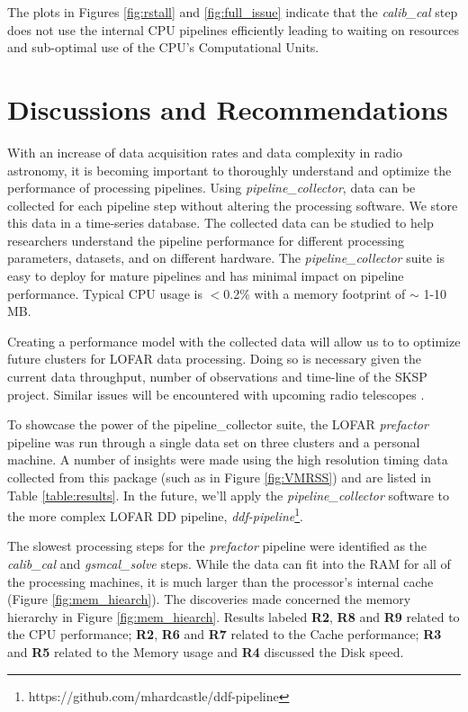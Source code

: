 The plots in Figures \ref{fig:rstall} and \ref{fig:full_issue} indicate that the \textit{calib\_cal} step does not use the internal CPU pipelines efficiently leading to waiting on resources and sub-optimal use of the CPU's Computational Units.

\section{Discussions and Recommendations}

With an increase of data acquisition rates and data complexity in radio astronomy, it is becoming important to thoroughly understand and optimize the performance of processing pipelines. Using \textit{pipeline\_collector}, data can be collected for each pipeline step without altering the processing software. We store this data in a time-series database. The collected data can be studied to help researchers understand the pipeline performance for different processing parameters, datasets, and on different hardware. The \textit{pipeline\_collector} suite is easy to deploy for mature pipelines and has minimal impact on pipeline performance. Typical CPU usage is $<$0.2\% with a memory footprint of $\sim$ 1-10 MB.

Creating a performance model with the collected data will allow us to to optimize future clusters for LOFAR data processing. Doing so is necessary given the current data throughput, number of observations and time-line of the SKSP project. Similar issues will be encountered with upcoming radio telescopes \citep{meerkat_ska_size}.


To showcase the power of the pipeline\_collector suite, the LOFAR \textit{prefactor} pipeline was run through a single data set on three clusters and a personal machine. A number of insights were made using the high resolution timing data collected from this package (such as in Figure \ref{fig:VMRSS}) and are listed in Table \ref{table:results}. In the future, we'll apply the \textit{pipeline\_collector} software to the more complex LOFAR DD pipeline, \textit{ddf-pipeline}\footnote{https://github.com/mhardcastle/ddf-pipeline}. 

The slowest processing steps for the \textit{prefactor} pipeline were identified as the \textit{calib\_cal} and \textit{gsmcal\_solve} steps. While the data can fit into the RAM for all of the processing machines, it is much larger than the processor's internal cache (Figure \ref{fig:mem_hiearch}).  The discoveries made concerned the memory hierarchy in Figure \ref{fig:mem_hiearch}. Results labeled \textbf{R2}, \textbf{R8} and \textbf{R9} related to the CPU performance; \textbf{R2}, \textbf{R6} and \textbf{R7} related to the Cache performance; \textbf{R3} and \textbf{R5} related to the Memory usage and \textbf{R4} discussed the Disk speed. 

